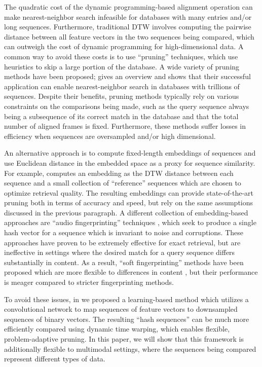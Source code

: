 \documentclass{article} %
\begin{document}
The quadratic cost of the dynamic programming-based alignment operation can make nearest-neighbor search infeasible for databases with many entries and/or long sequences.
Furthermore, traditional DTW involves computing the pairwise distance between all feature vectors in the two sequences being compared, which can outweigh the cost of dynamic programming for high-dimensional data.
A common way to avoid these costs is to use ``pruning'' techniques, which use heuristics to skip a large portion of the database.
A wide variety of pruning methods have been proposed; \cite{rakthanmanon2012searching} gives an overview and shows that their successful application can enable nearest-neighbor search in databases with trillions of sequences.
Despite their benefits, pruning methods typically rely on various constraints on the comparisons being made, such as the query sequence always being a subsequence of its correct match in the database and that the total number of aligned frames is fixed.
Furthermore, these methods suffer losses in efficiency when sequences are oversampled and/or high dimensional.

An alternative approach is to compute fixed-length embeddings of sequences and use Euclidean distance in the embedded space as a proxy for sequence similarity.
For example, \cite{papapetrou2011embedding} computes an embedding as the DTW distance between each sequence and a small collection of ``reference'' sequences which are chosen to optimize retrieval quality.
The resulting embeddings can provide state-of-the-art pruning both in terms of accuracy and speed, but rely on the same assumptions discussed in the previous paragraph.
A different collection of embedding-based approaches are ``audio fingerprinting'' techniques \cite{wang2003industrial}, which seek to produce a single hash vector for a sequence which is invariant to noise and corruptions.
These approaches have proven to be extremely effective for exact retrieval, but are ineffective in settings where the desired match for a query sequence differs substantially in content.
As a result, ``soft fingerprinting'' methods have been proposed which are more flexible to differences in content \cite{van2015audio}, but their performance is meager compared to stricter fingerprinting methods.

To avoid these issues, in \cite{raffel2015large} we proposed a learning-based method which utilizes a convolutional network to map sequences of feature vectors to downsampled sequences of binary vectors.
The resulting ``hash sequences'' can be much more efficiently compared using dynamic time warping, which enables flexible, problem-adaptive pruning.
In this paper, we will show that this framework is additionally flexible to multimodal settings, where the sequences being compared represent different types of data.
\end{document}
